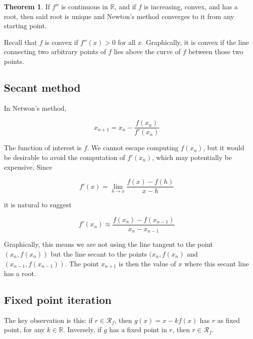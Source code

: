 \documentclass[12pt]{article}
\theoremstyle{definition}
\newtheorem{theorem}{Theorem}
\begin{document}
\begin{theorem}
    If $f''$ is continuous in $\mathbb{R}$, and if $f$ is increasing, convex,
    and has a root, then said root is unique and Newton's method converges to it
    from any starting point.
\end{theorem}

\begin{shaded}
    Recall that $f$ is convex if $f''(x) > 0$ for all $x$. Graphically, it is
    convex if the line connecting two arbitrary points of $f$ lies above the
    curve of $f$ between those two points.
\end{shaded}


\subsection{Secant method}

In Netwon's method, 

\begin{equation*}
    x_{n+1} = x_n - \frac{f(x_n)}{f'(x_n)}
\end{equation*}

The function of interest is $f$. We cannot escape computing $f(x_n)$, but it
would be desirable to avoid the computation of $f'(x_n)$, which may potentially
be expensive. Since

\begin{equation*}
    f'(x) = \lim_{h \to x}  \frac{f(x) - f(h)}{x-h}
\end{equation*}

it is natural to suggest 

\begin{equation}
    f'(x_n) \approx \frac{f(x_n) - f(x_{n-1})}{x_n - x_{n-1}}
\end{equation}

Graphically, this means we are not using the line tangent to the point $(x_n,
f(x_n))$ but the line secant to the points $(x_n, f(x_n)$ and $(x_{n-1},
f(x_{n-1}))$. The point $x_{n+1}$ is then the value of $x$ where this secant
line has a root.

\subsection{Fixed point iteration}

The key observation is  this: if $r \in \mathcal{R}_f$, then $g(x) = x - kf(x)$
has $r$ as fixed point, for any $k \in \mathbb{R}$. Inversely, if $g$ has a
fixed point in $r$, then $r \in \mathcal{R}_f$. 
\end{document}
